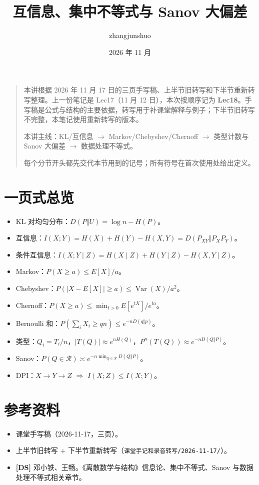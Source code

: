 \documentclass[UTF8,a4paper,11pt]{ctexart}
\title{互信息、集中不等式与 Sanov 大偏差}\author{zhangjunshuo}\date{2026 年 11 月}
\begin{document}
\maketitle
\begin{quote}
本讲根据 2026 年 11 月 17 日的三页手写稿、上半节旧转写和下半节重新转写整理。上一份笔记是 Lec17（11 月 12 日），本次按顺序记为 \textbf{Lec18}。手写稿是公式与结构的主要依据，转写用于补课堂解释与例子；下半节旧转写不完整，本笔记使用重新转写的版本。

本讲主线：KL/互信息 $\to$ Markov/Chebyshev/Chernoff $\to$ 类型计数与 Sanov 大偏差 $\to$ 数据处理不等式。

每个分节开头都先交代本节用到的记号；所有符号在首次使用处给出定义。
\end{quote}
\setcounter{tocdepth}{1}\tableofcontents\clearpage






\section*{一页式总览}
\begin{itemize}
\item KL 对均匀分布：$D(P\Vert U)=\log n-H(P)$。
\item 互信息：$I(X;Y)=H(X)+H(Y)-H(X,Y)=D(P_{XY}\Vert P_XP_Y)$。
\item 条件互信息：$I(X;Y\mid Z)=H(X\mid Z)+H(Y\mid Z)-H(X,Y\mid Z)$。
\item Markov：$P(X\ge a)\le E[X]/a$。
\item Chebyshev：$P(|X-E[X]|\ge a)\le\operatorname{Var}(X)/a^2$。
\item Chernoff：$P(X\ge a)\le\min_{t>0}E[e^{tX}]/e^{ta}$。
\item Bernoulli 和：$P(\sum_iX_i\ge qn)\le e^{-nD(q\Vert p)}$。
\item 类型：$Q_i=T_i/n$，$|T(Q)|\approx e^{nH(Q)}$，$P^n(T(Q))\approx e^{-nD(Q\Vert P)}$。
\item Sanov：$P(Q\in\mathcal R)\asymp e^{-n\min_{Q\in\mathcal R}D(Q\Vert P)}$。
\item DPI：$X\to Y\to Z$ $\Rightarrow$ $I(X;Z)\le I(X;Y)$。
\end{itemize}

\section*{参考资料}
\begin{itemize}
\item 课堂手写稿（2026-11-17，三页）。
\item 上半节旧转写 + 下半节重新转写（\texttt{课堂手记和录音转写/2026-11-17/}）。
\item \textbf{[DS]} 邓小铁、王畅。《离散数学与结构》信息论、集中不等式、Sanov 与数据处理不等式相关章节。
\end{itemize}
\end{document}
